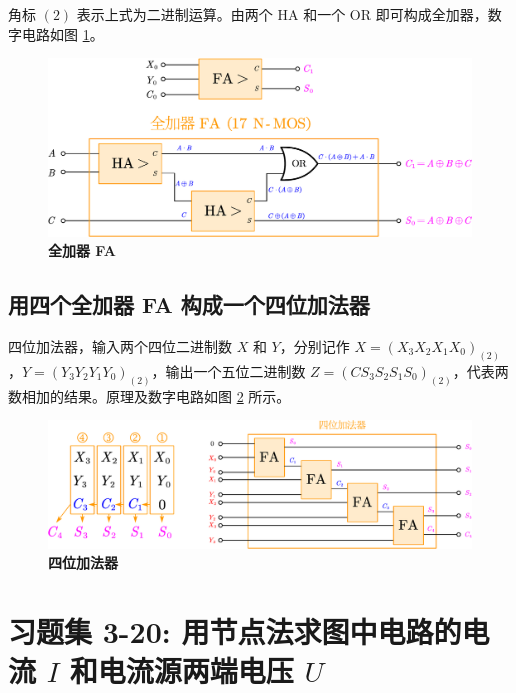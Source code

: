 \documentclass[UTF8]{report}
\theoremstyle{MyLineTheoremStyle} %
\theoremstyle{MyBlockTheoremStyle} %
\theoremstyle{MySubsubsectionStyle} %
\begin{document}
角标 $(2)$ 表示上式为二进制运算。由两个 HA 和一个 OR 即可构成全加器，数字电路如图 \ref{全加器 FA}。

\begin{figure}[H]\centering
\includegraphics[width=0.65\columnwidth]{assets/5/全加器.pdf}
\caption{\bfseries 全加器 FA}\label{全加器 FA}
\end{figure}



\subsection{用四个全加器 FA 构成一个四位加法器}

四位加法器，输入两个四位二进制数 $X$ 和 $Y$，分别记作 $ X= (X_3 X_2 X_1 X_0)_{(2)}$，$ Y=  (Y_3 Y_2 Y_1 Y_0)_{(2)}$，输出一个五位二进制数 $Z = (C S_3 S_2 S_1 S_0)_{(2)}$，代表两数相加的结果。原理及数字电路如图 \ref{四位加法器} 所示。

\begin{figure}[H]\centering
\includegraphics[width=0.9\columnwidth]{assets/5/四位加法器.pdf}
\caption{\bfseries 四位加法器}\label{四位加法器}
\end{figure}


\section{习题集 3-20: 用节点法求图中电路的电流 $I$ 和电流源两端电压 $U$}
\end{document}
